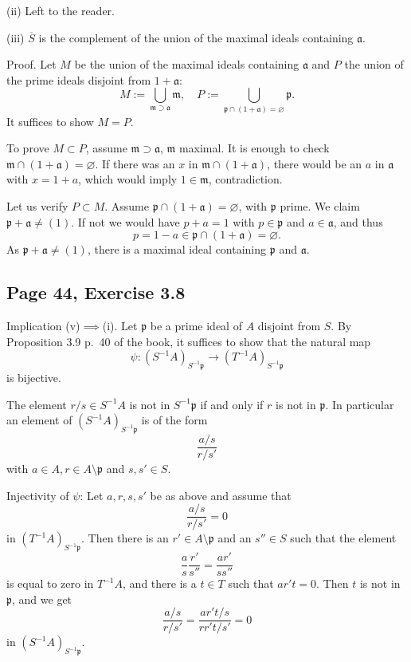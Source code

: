 \documentclass[parskip=half,fontsize=12pt]{scrartcl}%
\newcommand{\mf}{\mathfrak}
\newcommand{\aaa}{\mf a}
\newcommand{\mmm}{\mf m}
\newcommand{\ppp}{\mf p}
\begin{document}
(ii) Left to the reader.

(iii) $\overline S$ is the complement of the union of the maximal ideals containing $\aaa$. 

Proof. Let $M$ be the union of the maximal ideals containing $\aaa$ and $P$ the union of the prime ideals disjoint from $1+\aaa$:
$$
M:=\bigcup_{\mmm\supset\aaa}\mmm,\quad P:=\bigcup_{\ppp\cap(1+\aaa)=\varnothing}\ppp.
$$ 
It suffices to show $M=P$. 

To prove $M\subset P$, assume $\mmm\supset\aaa$, $\mmm$ maximal. It is enough to check $\mmm\cap(1+\aaa)=\varnothing$. If there was an $x$ in $\mmm\cap(1+\aaa)$, there would be an $a$ in $\aaa$ with $x=1+a$, which would imply $1\in\mmm$, contradiction. 

Let us verify $P\subset M$. Assume $\ppp\cap(1+\aaa)=\varnothing$, with $\ppp$ prime. We claim $\ppp+\aaa\ne(1)$. If not we would have $p+a=1$ with $p\in\ppp$ and $a\in\aaa$, and thus 
$$
p=1-a\in\ppp\cap(1+\aaa)=\varnothing.
$$ 
As $\ppp+\aaa\ne(1)$, there is a maximal ideal containing $\ppp$ and $\aaa$.



\subsection{Page 44, Exercise 3.8}%

Implication (v)$\implies$(i). Let $\ppp$ be a prime ideal of $A$ disjoint from $S$. By Proposition 3.9 p.~40 of the book, it suffices to show that the natural map 
$$
\psi:(S^{-1}A)_{S^{-1}\ppp}\to(T^{-1}A)_{S^{-1}\ppp}
$$ 
is bijective. 

The element $r/s\in S^{-1}A$ is not in $S^{-1}\ppp$ if and only if $r$ is not in $\ppp$. In particular an element of $(S^{-1}A)_{S^{-1}\ppp}$ is of the form 
$$
\frac{a/s}{r/s'}
$$ 
with $a\in A, r\in A\setminus\ppp$ and $s,s'\in S$.

Injectivity of $\psi$: Let $a,r,s,s'$ be as above and assume that  
$$
\frac{a/s}{r/s'}=0
$$ 
in $(T^{-1}A)_{S^{-1}\ppp}$. Then there is an $r'\in A\setminus\ppp$ and an $s''\in S$ such that the element 
$$
\frac{a}{s}\frac{r'}{s''}=\frac{ar'}{ss''}
$$ 
is equal to zero in $T^{-1}A$, and there is a $t\in T$ such that $ar't=0$. Then $t$ is not in $\ppp$, and we get %
$$
\frac{a/s}{r/s'}=\frac{ar't/s}{rr't/s'}=0
$$ 
in $(S^{-1}A)_{S^{-1}\ppp}$.
\end{document}
